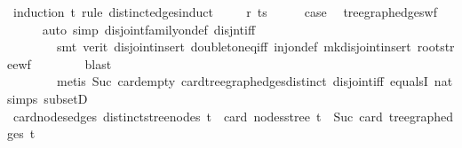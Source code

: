 \begin{isabellebody}
%
\isadelimproof
%
\endisadelimproof
%
\isatagproof
{}\isamarkupfalse%
\ {\isacharparenleft}{\kern0pt}induction\ t\ rule{\isacharcolon}{\kern0pt}\ distinct{\isacharunderscore}{\kern0pt}edges{\isachardot}{\kern0pt}induct{\isacharparenright}{\kern0pt}\isanewline
\ \ \isamarkupfalse%
\ {\isacharparenleft}{\kern0pt}{}\ r\ ts{\isacharparenright}{\kern0pt}\isanewline
\ \ \isamarkupfalse%
\ \isamarkupfalse%
\ {\isacharquery}{\kern0pt}case\ \isamarkupfalse%
\ tree{\isacharunderscore}{\kern0pt}graph{\isacharunderscore}{\kern0pt}edges{\isacharunderscore}{\kern0pt}wf\isanewline
\ \ \ \ \isamarkupfalse%
\ {\isacharparenleft}{\kern0pt}auto\ simp{\isacharcolon}{\kern0pt}\ disjoint{\isacharunderscore}{\kern0pt}family{\isacharunderscore}{\kern0pt}on{\isacharunderscore}{\kern0pt}def\ disjnt{\isacharunderscore}{\kern0pt}iff{\isacharcomma}{\kern0pt}\isanewline
\ \ \ \ \ \ \ \ smt\ {\isacharparenleft}{\kern0pt}verit{\isacharparenright}{\kern0pt}\ disjoint{\isacharunderscore}{\kern0pt}insert{\isacharparenleft}{\kern0pt}{}{\isacharparenright}{\kern0pt}\ doubleton{\isacharunderscore}{\kern0pt}eq{\isacharunderscore}{\kern0pt}iff\ inj{\isacharunderscore}{\kern0pt}on{\isacharunderscore}{\kern0pt}def\ mk{\isacharunderscore}{\kern0pt}disjoint{\isacharunderscore}{\kern0pt}insert\ root{\isacharunderscore}{\kern0pt}stree{\isacharunderscore}{\kern0pt}wf{\isacharcomma}{\kern0pt}\isanewline
\ \ \ \ \ \ \ \ blast{\isacharcomma}{\kern0pt}\isanewline
\ \ \ \ \ \ \ \ metis\ Suc{\isacharunderscore}{\kern0pt}{}\ card{\isachardot}{\kern0pt}empty\ card{\isacharunderscore}{\kern0pt}tree{\isacharunderscore}{\kern0pt}graph{\isacharunderscore}{\kern0pt}edges{\isacharunderscore}{\kern0pt}distinct\ disjoint{\isacharunderscore}{\kern0pt}iff\ equals{}I\ nat{\isachardot}{\kern0pt}simps{\isacharparenleft}{\kern0pt}{}{\isacharparenright}{\kern0pt}\ subsetD{\isacharparenright}{\kern0pt}\isanewline
{}\isamarkupfalse%
%
\endisatagproof
{\isafoldproof}%
%
\isadelimproof
\isanewline
%
\endisadelimproof
\isanewline
{}\isamarkupfalse%
\ card{\isacharunderscore}{\kern0pt}nodes{\isacharunderscore}{\kern0pt}edges{\isacharcolon}{\kern0pt}\ {\isachardoublequoteopen}distinct{\isacharunderscore}{\kern0pt}stree{\isacharunderscore}{\kern0pt}nodes\ t\ {\isasymLongrightarrow}\ card\ {\isacharparenleft}{\kern0pt}nodes{\isacharunderscore}{\kern0pt}stree\ t{\isacharparenright}{\kern0pt}\ {\isacharequal}{\kern0pt}\ Suc\ {\isacharparenleft}{\kern0pt}card\ {\isacharparenleft}{\kern0pt}tree{\isacharunderscore}{\kern0pt}graph{\isacharunderscore}{\kern0pt}edges\ t{\isacharparenright}{\kern0pt}{\isacharparenright}{\kern0pt}{\isachardoublequoteclose}\isanewline

\end{isabellebody}
